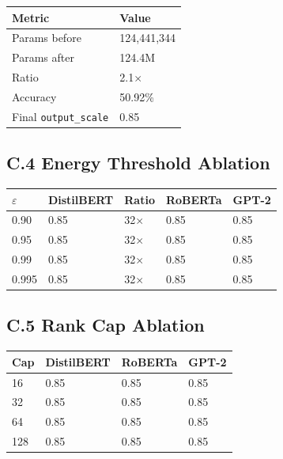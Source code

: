 \begin{table}[H]
\centering
\small
\begin{tabular}{ll}
\toprule
\textbf{Metric} & \textbf{Value} \\
\midrule
Params before & 124,441,344 \\
Params after & 124.4M \\
Ratio & 2.1$\times$ \\
Accuracy & 50.92\% \\
Final \texttt{output\_scale} & 0.85 \\
\bottomrule
\end{tabular}
\end{table}

\subsection{C.4 Energy Threshold Ablation}

\begin{table}[H]
\centering
\small
\begin{tabular}{lllll}
\toprule
\textbf{$\varepsilon$} & \textbf{DistilBERT} & \textbf{Ratio} & \textbf{RoBERTa} & \textbf{GPT-2} \\
\midrule
0.90 & 0.85 & 32$\times$ & 0.85 & 0.85 \\
0.95 & 0.85 & 32$\times$ & 0.85 & 0.85 \\
0.99 & 0.85 & 32$\times$ & 0.85 & 0.85 \\
0.995 & 0.85 & 32$\times$ & 0.85 & 0.85 \\
\bottomrule
\end{tabular}
\end{table}

\subsection{C.5 Rank Cap Ablation}

\begin{table}[H]
\centering
\small
\begin{tabular}{llll}
\toprule
\textbf{Cap} & \textbf{DistilBERT} & \textbf{RoBERTa} & \textbf{GPT-2} \\
\midrule
16 & 0.85 & 0.85 & 0.85 \\
32 & 0.85 & 0.85 & 0.85 \\
64 & 0.85 & 0.85 & 0.85 \\
128 & 0.85 & 0.85 & 0.85 \\
\bottomrule
\end{tabular}
\end{table}


